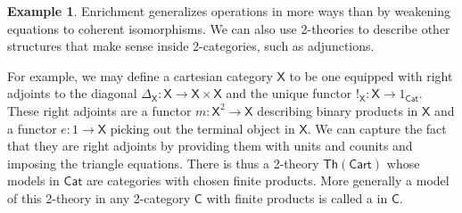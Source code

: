 \documentclass{amsart}
\newcommand{\define}[1]{{\bf \boldmath{#1}}}
\theoremstyle{definition}
\newtheorem{example}[theorem]{Example}
\newcommand{\Th}{\mathsf{Th}}
\newcommand{\Cat}{\mathsf{Cat}}
\newcommand{\C}{\mathsf{C}}
\newcommand{\X}{\mathsf{X}}
\newcommand{\maps}{\colon}
\begin{document}
\begin{example}
\label{ex:2}
 Enrichment generalizes operations in more ways than by weakening equations to coherent isomorphisms.  We can also use 2-theories to describe other structures that make sense inside 2-categories, such as adjunctions. 
  
For example, we may define a cartesian category $\X$ to be one equipped with right adjoints to the diagonal $\Delta_\X\maps \X \to \X \times \X$ and the unique functor $!_\X \maps \X \to 1_\Cat$.    These right adjoints are a functor $m \maps \X^2 \to \X$ describing binary products in $\X$ and a functor $e \maps 1 \to \X$ picking out the terminal object in $\X$.   We can capture the fact that they are right adjoints by providing them with units and counits and imposing the triangle equations.   There is thus a 2-theory $\Th(\mathsf{Cart})$ whose models in $\Cat$ are categories with chosen finite products.  More generally a model of this 2-theory in any 2-category $\C$ with finite products is called a \define{cartesian object} in $\C$.  


\end{example}
\end{document}
